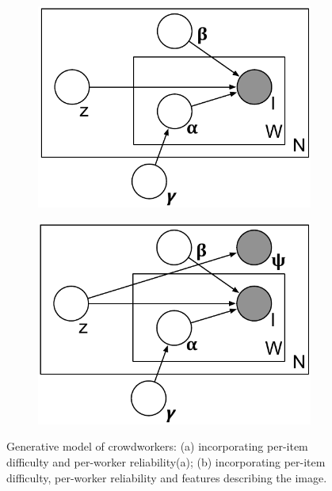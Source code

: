 \documentclass{../acm_proc_article-me11_tweaked}
\begin{document}
\begin{figure}[t]
\centering
\begin{subfigure}[t]{0.48\columnwidth}
	\centering
	\includegraphics[width=0.9\columnwidth]{images/model1}
	\caption{\label{fig:model1}}
\end{subfigure}
\begin{subfigure}[t]{0.48\columnwidth}
	\centering
	\includegraphics[width=0.9\columnwidth]{images/model2}
	\caption{\label{fig:model2}}
\end{subfigure}
\caption{Generative model of crowdworkers: (a) incorporating per-item difficulty and per-worker reliability(a); (b) incorporating per-item difficulty, per-worker reliability and features describing the image.}
\end{figure}
	
\end{document}
